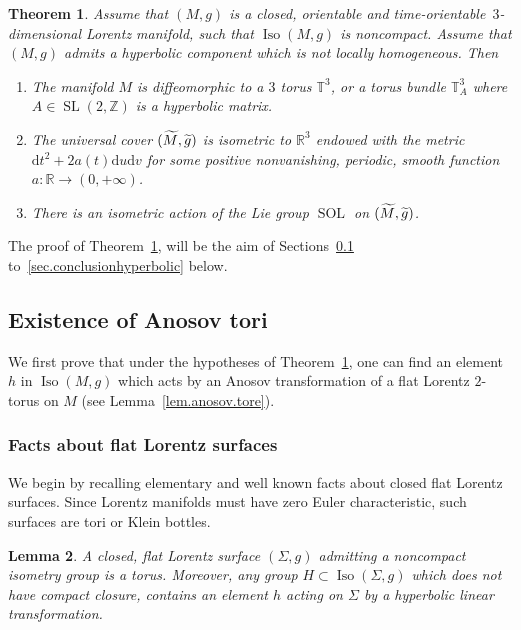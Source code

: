 \documentclass[11pt]{article}
\newtheorem{theo}{Theorem}[section]
\newtheorem{lemm}[theo]{Lemma}
\theoremstyle{definition}
\numberwithin{equation}{section}
\numberwithin{figure}{section}
\numberwithin{table}{section}
\DeclareMathOperator{\Iso}{Iso}
\DeclareMathOperator{\SL}{SL}
\DeclareMathOperator{\Sol}{SOL}
\newcommand*\RR{\mathbb{R}}
\newcommand*\ZZ{\mathbb{Z}}
\let\oldtilde\tilde
\renewcommand*\tilde[1]{\mathchoice{\widetilde{#1}}{\widetilde{#1}}{\widetilde{#1}}{\oldtilde{#1}}}
\newcommand*{\dd}{\mathrm{d}}
\newcommand*{\dt}{\dd t}
\newcommand*{\du}{\dd u}
\newcommand*{\dv}{\dd v}
\begin{document}
\begin{theo}\label{theo.hyperbolic}
Assume that $(M,g)$ is a closed, orientable and time-orientable~$3$-dimensional Lorentz manifold, such that $\Iso(M,g)$ is noncompact. Assume that $(M,g)$ admits a hyperbolic component which is not locally homogeneous. Then
\begin{enumerate}
\item \label{list5.2.1}The manifold $M$ is diffeomorphic to a $3$ torus ${\mathbb T}^3$, or a torus bundle ${\mathbb T}_A^3$ where $A \in \SL(2,\ZZ)$ is a hyperbolic matrix.
\item \label{list5.2.2}The universal cover $(\tilde{M},\tilde{g})$ is isometric to $\RR^3$ endowed with the metric $\dt^2+2a(t)\du\dv$ for some positive nonvanishing, periodic, smooth function $a: \RR \to (0,+\infty)$.
\item \label{list5.2.3}There is an isometric action of the Lie group $\Sol$ on $(\tilde{M},\tilde{g})$.
\end{enumerate}
\end{theo}

The proof of Theorem~\ref{theo.hyperbolic}, will be the aim of Sections~\ref{sec.anosovtori} to~\ref{sec.conclusionhyperbolic} below.

\subsection{Existence of Anosov tori}\label{sec.anosovtori}
We first prove that under the hypotheses of Theorem~\ref{theo.hyperbolic}, one can find an element $h$ in $\Iso(M,g)$ which acts by an Anosov transformation of a flat Lorentz $2$-torus on $M$ (see Lemma~\ref{lem.anosov.tore}).

\subsubsection{Facts about flat Lorentz surfaces}
We begin by recalling elementary and well known facts about closed flat Lorentz surfaces. Since Lorentz manifolds must have zero Euler characteristic, such surfaces are tori or Klein bottles.
\begin{lemm}\label{lem.lorentzsurface}
A closed, flat Lorentz surface $(\Sigma,g)$ admitting a noncompact isometry group is a torus. Moreover, any group $H \subset \Iso(\Sigma,g)$ which does not have compact closure, contains an element $h$ acting on $\Sigma$ by a hyperbolic linear transformation.
\end{lemm}
\end{document}
